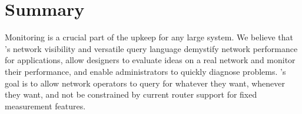 \section{Summary}
\label{s:pq_summary}
Monitoring is a crucial part of the upkeep for any large system. We believe
that \TheSystem's network visibility and versatile query language demystify
network performance for applications, allow designers to evaluate ideas on a
real network and monitor their performance, and enable administrators to
quickly diagnose problems.  \TheSystem's goal is to allow network operators to
query for whatever they want, whenever they want, and not be constrained by
current router support for fixed measurement features.
